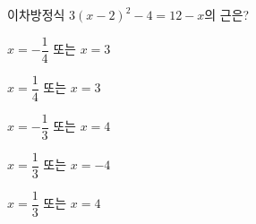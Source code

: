 이차방정식 $3(x-2)^2-4=12-x$의 근은?
\begin{choicesii}{\rule[-3ex]{0pt}{8ex}$x=-\dfrac{1}{4}$ 또는 $x=3$}{\rule[-3ex]{0pt}{8ex}$x=\dfrac{1}{4}$ 또는 $x=3$}{\rule[-3ex]{0pt}{8ex}$x=-\dfrac{1}{3}$ 또는 $x=4$}{\rule[-3ex]{0pt}{8ex}$x=\dfrac{1}{3}$ 또는 $x=-4$}{\rule[-3ex]{0pt}{8ex}$x=\dfrac{1}{3}$ 또는 $x=4$}\end{choicesii}
